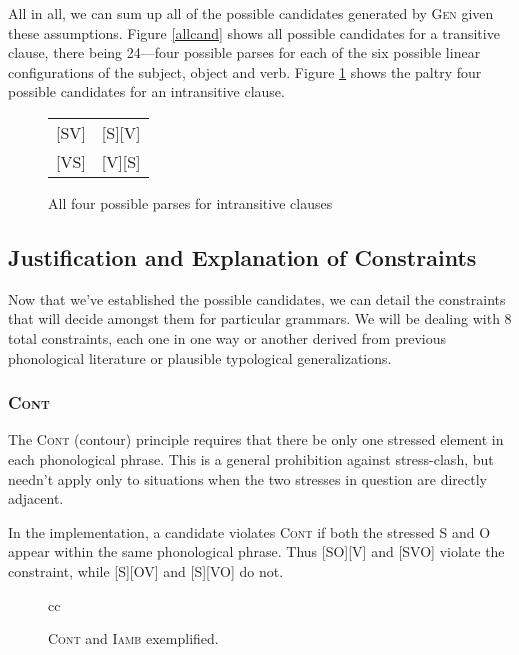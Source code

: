 \documentclass{article}
\newcommand{\cont}{\textsc{Cont}}
\newcommand{\iamb}{\textsc{Iamb}}
\begin{document}
All in all, we can sum up all of the possible candidates generated by \textsc{Gen} given these assumptions.
Figure \ref{allcand} shows all possible candidates for a transitive clause, there being 24---four possible parses for each of the six possible linear configurations of the subject, object and verb.
Figure \ref{instrans} shows the paltry four possible candidates for an intransitive clause.

\begin{figure}
	\begin{center}
		\begin{tabular}{cc}
			{}[SV]&[S][V]\\
			{}[VS]&[V][S]\\
		\end{tabular}
	\end{center}
	\caption{All four possible parses for intransitive clauses\label{instrans}}
\end{figure}

\subsection{Justification and Explanation of Constraints\label{straints}}

Now that we've established the possible candidates, we can detail the constraints that will decide amongst them for particular grammars.
We will be dealing with 8 total constraints, each one in one way or another derived from previous phonological literature or plausible typological generalizations.

\subsubsection{\cont}

The {\cont} (contour) principle requires that there be only one stressed element in each phonological phrase.
This is a general prohibition against stress-clash, but needn't apply only to situations when the two stresses in question are directly adjacent.

In the implementation, a candidate violates {\cont} if both the stressed S and O appear within the same phonological phrase.
Thus [SO][V] and [SVO] violate the constraint, while [S][OV] and [S][VO] do not.

\begin{figure}
\begin{center}
\begin{tableau}{cc}
		\const{\cont}	\const{\iamb}
	\cand[\Optimal]{[S][OV]} \vio{}		\vio{}
	\cand{[S][VO]} \vio{}		\vio{*!}
	\cand{[SO][V]} \vio{*!}\vio{}
	\cand{[SOV]} \vio{*!}\vio{}
	\cand{[SVO]} \vio{*!}	\vio{*}
\end{tableau}
\end{center}
	\caption{\cont{} and {\iamb} exemplified.}
\end{figure}
\end{document}
